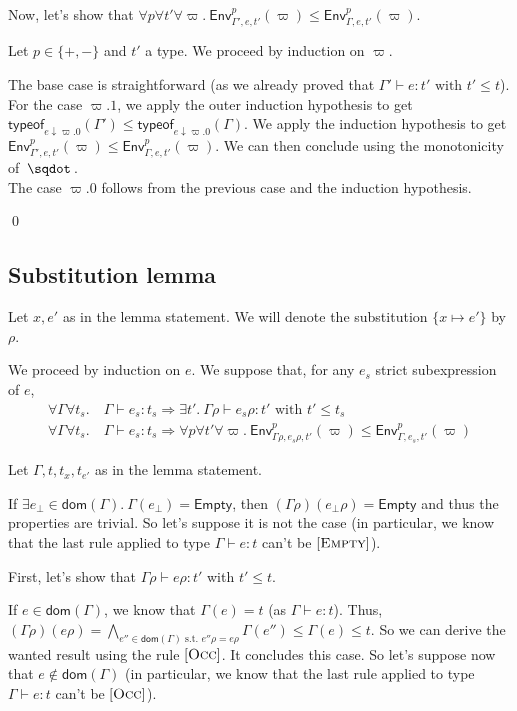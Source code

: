 \documentclass[a4paper]{article}%
\newcommand{\worra}[2]{#1\mathop{\,\sqdot\,} #2}
\newcommand{\dom}[1]{\textsf{dom}(#1)}
\newcommand{\Empty} {\textsf{Empty}}%
\newcommand{\subst}[2]{\{#1 \mapsto #2\}}
\newcommand{\tyof}[2]{\textsf{typeof}_{#2}(#1)}
\newcommand{\Gp}[2]{\textsf{Env}^{#1}_{#2}}
\theoremstyle{definition}
\newcommand {\Rule}[1] {[\textsc{#1}]}
\begin{document}
    Now, let's show that $\forall p \forall t' \forall \varpi.\ \Gp p {\Gamma',e,t'} (\varpi) \leq \Gp p {\Gamma,e,t'} (\varpi)$.

    Let $p\in \{+,-\}$ and $t'$ a type.
    We proceed by induction on $\varpi$.
    
    The base case is straightforward (as we already proved that $\Gamma' \vdash e:t' \text{ with } t' \leq t$).\\
    For the case $\varpi.1$, we apply the outer induction hypothesis to get $\tyof {\Gamma'} {e\downarrow\varpi.0} \leq \tyof {\Gamma} {e\downarrow\varpi.0}$.
    We apply the induction hypothesis to get $\Gp p {\Gamma',e,t'} (\varpi) \leq \Gp p {\Gamma,e,t'} (\varpi)$. We can then conclude using the monotonicity of $\worra {} {}$.\\
    The case $\varpi.0$ follows from the previous case and the induction hypothesis.

    \qed

    \subsection{Substitution lemma}

    Let $x,e'$ as in the lemma statement. We will denote the substitution $\subst x {e'}$ by $\rho$.

    We proceed by induction on $e$. We suppose that, for any $e_s$ strict subexpression of $e$,
    \begin{align*}
      \forall \Gamma \forall t_s.\ &\Gamma \vdash e_s:t_s \Rightarrow \exists t'.\ \Gamma \rho \vdash e_s \rho:t' \text{ with } t'\leq t_s\\
      \forall \Gamma \forall t_s.\ &\Gamma \vdash e_s:t_s \Rightarrow \forall p \forall t' \forall \varpi.\ \Gp p {\Gamma\rho,e_s\rho,t'} (\varpi) \leq \Gp p {\Gamma,e_s,t'} (\varpi)
    \end{align*}

    Let $\Gamma,t,t_x,t_{e'}$ as in the lemma statement.

    If $\exists e_\bot \in \dom {\Gamma}.\ \Gamma(e_\bot) = \Empty$, then $(\Gamma\rho)(e_\bot\rho) = \Empty$ and thus the properties are trivial.
    So let's suppose it is not the case (in particular, we know that the last rule applied to type $\Gamma \vdash e:t$ can't be $\Rule{Empty}$).

    First, let's show that $\Gamma \rho \vdash e \rho:t'$ with $t'\leq t$.

    If $e\in\dom\Gamma$, we know that $\Gamma(e)=t$ (as $\Gamma \vdash e:t$). Thus, $(\Gamma\rho)(e\rho)=\bigwedge_{e'' \in \dom \Gamma \text{ s.t. } e''\rho=e\rho} \Gamma(e'') \leq \Gamma(e) \leq t$.
    So we can derive the wanted result using the rule $\Rule {Occ}$. It concludes this case. So let's suppose now that $e\not\in\dom\Gamma$ (in particular, we know that the last rule applied to type $\Gamma \vdash e:t$ can't be $\Rule{Occ}$).
    
\end{document}
